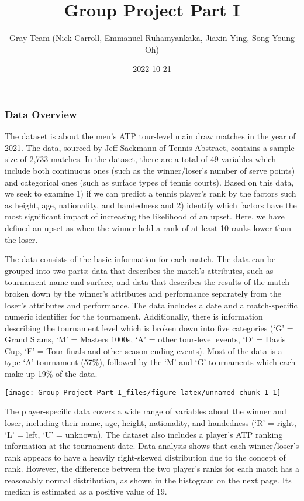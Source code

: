 \documentclass[
]{article}
\title{Group Project Part I}
\author{Gray Team (Nick Carroll, Emmanuel Ruhamyankaka, Jiaxin Ying,
Song Young Oh)}
\date{2022-10-21}
\begin{document}
\maketitle

\hypertarget{data-overview}{%
\subsubsection{Data Overview}\label{data-overview}}

The dataset is about the men's ATP tour-level main draw matches in the
year of 2021. The data, sourced by Jeff Sackmann of Tennis Abstract,
contains a sample size of 2,733 matches. In the dataset, there are a
total of 49 variables which include both continuous ones (such as the
winner/loser's number of serve points) and categorical ones (such as
surface types of tennis courts). Based on this data, we seek to examine
1) if we can predict a tennis player's rank by the factors such as
height, age, nationality, and handedness and 2) identify which factors
have the most significant impact of increasing the likelihood of an
upset. Here, we have defined an upset as when the winner held a rank of
at least 10 ranks lower than the loser.

The data consists of the basic information for each match. The data can
be grouped into two parts: data that describes the match's attributes,
such as tournament name and surface, and data that describes the results
of the match broken down by the winner's attributes and performance
separately from the loser's attributes and performance. The data
includes a date and a match-specific numeric identifier for the
tournament. Additionally, there is information describing the tournament
level which is broken down into five categories (`G' = Grand Slams, `M'
= Masters 1000s, `A' = other tour-level events, `D' = Davis Cup, `F' =
Tour finals and other season-ending events). Most of the data is a type
`A' tournament (57\%), followed by the `M' and `G' tournaments which
each make up 19\% of the data.

\begin{center}\texttt{[image: Group-Project-Part-I\_files/figure-latex/unnamed-chunk-1-1]} \end{center}

The player-specific data covers a wide range of variables about the
winner and loser, including their name, age, height, nationality, and
handedness (`R' = right, `L' = left, `U' = unknown). The dataset also
includes a player's ATP ranking information at the tournament date. Data
analysis shows that each winner/loser's rank appears to have a heavily
right-skewed distribution due to the concept of rank. However, the
difference between the two player's ranks for each match has a
reasonably normal distribution, as shown in the histogram on the next
page. Its median is estimated as a positive value of 19.
\end{document}
